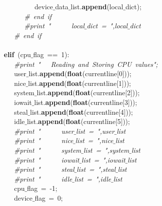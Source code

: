 \mbox{}\ \ \ \ \ \ \ \ \ \ \ \ \ \ \ \ \ \ device$\_$data$\_$list.\textbf{append}(local$\_$dict); \\
\mbox{}\ \ \ \ \ \ \ \ \ \ \ \ \ \ \ \textit{\#\ end\ if} \\
\mbox{}\ \ \ \ \ \ \ \ \ \ \ \ \ \ \ \textit{\#print\ "{}\ \ \ \ \ \ local$\_$dict\ =\ "{},local$\_$dict} \\
\mbox{}\ \ \ \ \ \ \ \ \ \ \ \ \textit{\#\ end\ if} \\
\mbox{}\ \ \ \ \ \ \ \ \ \ \ \ \ \ \  \\
\mbox{}\ \ \ \ \ \ \ \ \ \textbf{elif}\ (cpu$\_$flag\ ==\ 1): \\
\mbox{}\ \ \ \ \ \ \ \ \ \ \ \ \textit{\#print\ "{}\ \ \ Reading\ and\ Storing\ CPU\ values"{};} \\
\mbox{}\ \ \ \ \ \ \ \ \ \ \ \ user$\_$list.\textbf{append}(\textbf{float}(currentline[0])); \\
\mbox{}\ \ \ \ \ \ \ \ \ \ \ \ nice$\_$list.\textbf{append}(\textbf{float}(currentline[1])); \\
\mbox{}\ \ \ \ \ \ \ \ \ \ \ \ system$\_$list.\textbf{append}(\textbf{float}(currentline[2])); \\
\mbox{}\ \ \ \ \ \ \ \ \ \ \ \ iowait$\_$list.\textbf{append}(\textbf{float}(currentline[3])); \\
\mbox{}\ \ \ \ \ \ \ \ \ \ \ \ steal$\_$list.\textbf{append}(\textbf{float}(currentline[4])); \\
\mbox{}\ \ \ \ \ \ \ \ \ \ \ \ idle$\_$list.\textbf{append}(\textbf{float}(currentline[5])); \\
\mbox{}\ \ \ \ \ \ \ \ \ \ \ \ \textit{\#print\ "{}\ \ \ \ \ \ user$\_$list\ =\ "{},user$\_$list} \\
\mbox{}\ \ \ \ \ \ \ \ \ \ \ \ \textit{\#print\ "{}\ \ \ \ \ \ nice$\_$list\ =\ "{},nice$\_$list} \\
\mbox{}\ \ \ \ \ \ \ \ \ \ \ \ \textit{\#print\ "{}\ \ \ \ \ \ system$\_$list\ =\ "{},system$\_$list} \\
\mbox{}\ \ \ \ \ \ \ \ \ \ \ \ \textit{\#print\ "{}\ \ \ \ \ \ iowait$\_$list\ =\ "{},iowait$\_$list} \\
\mbox{}\ \ \ \ \ \ \ \ \ \ \ \ \textit{\#print\ "{}\ \ \ \ \ \ steal$\_$list\ =\ "{},steal$\_$list} \\
\mbox{}\ \ \ \ \ \ \ \ \ \ \ \ \textit{\#print\ "{}\ \ \ \ \ \ idle$\_$list\ =\ "{},idle$\_$list} \\
\mbox{}\ \ \ \ \ \ \ \ \ \ \ \ cpu$\_$flag\ =\ -1; \\
\mbox{}\ \ \ \ \ \ \ \ \ \ \ \ device$\_$flag\ =\ 0; \\
